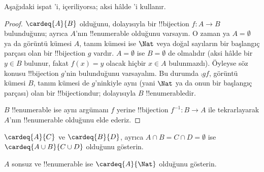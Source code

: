 \documentclass[../../../include/open-logic-section]{subfiles}
\begin{document}
\begin{editorial}
  Aşağıdaki ispat 'i, 
  içeriliyorsa; aksi hâlde 'i kullanır.
\end{editorial}

\begin{proof}
$\cardeq{A}{B}$ olduğunu, dolayısıyla bir !!{bijection} $f\colon A\to B$
bulunduğunu; ayrıca $A$'nın !!{enumerable} olduğunu varsayın.
{
  O zaman ya $A=\emptyset$ ya da görüntü kümesi $A$, tanım kümesi ise
  $\Nat$ veya doğal sayıların bir başlangıç parçası olan bir !!{bijection}
  $g$ vardır. $A=\emptyset$ ise $B=\emptyset$ de olmalıdır (aksi hâlde bir
  $y\in B$ bulunur, fakat $f(x)=y$ olacak hiçbir $x\in A$ bulunmazdı).
  Öyleyse söz konusu !!{bijection} $g$'nin bulunduğunu varsayalım. Bu durumda
  $\comp{g}{f}$, görüntü kümesi $B$, tanım kümesi de $g$'ninkiyle aynı (yani
  $\Nat$ ya da onun bir başlangıç parçası) olan bir !!{bijection}dur;
  dolayısıyla $B$ !!{enumerable}dir.}

$B$ !!{enumerable} ise aynı argümanı $f$ yerine !!{bijection}
$f^{-1}\colon B\to A$ ile tekrarlayarak $A$'nın !!{enumerable} olduğunu
elde ederiz.
\end{proof}

\begin{prob}
$\cardeq{A}{C}$ ve $\cardeq{B}{D}$, ayrıca $A\cap B=C\cap D=\emptyset$ ise
$\cardeq{A\cup B}{C\cup D}$ olduğunu gösterin.
\end{prob}

\begin{prob}
$A$ sonsuz ve !!{enumerable} ise $\cardeq{A}{\Nat}$ olduğunu gösterin.
\end{prob}
\end{document}
